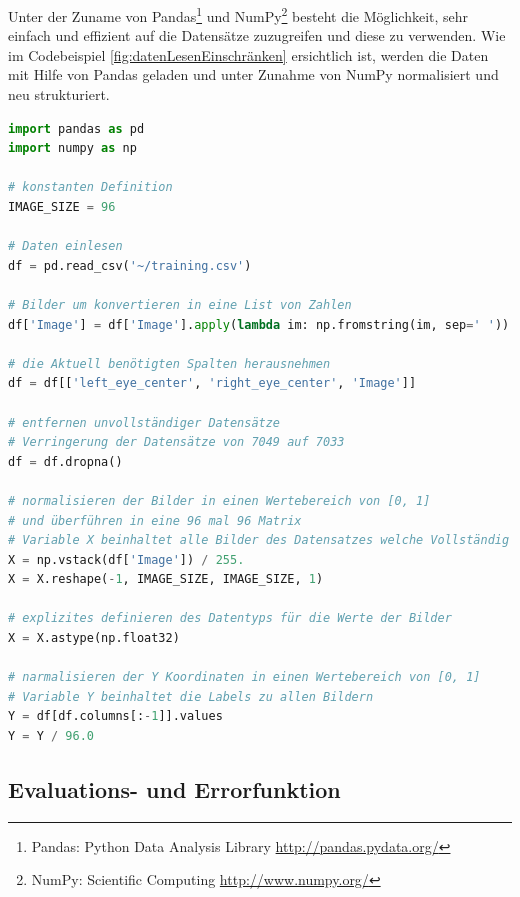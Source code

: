 \noindent
Unter der Zuname von Pandas\footnote{Pandas: Python Data Analysis Library \url{http://pandas.pydata.org/}} und NumPy\footnote{NumPy: Scientific Computing \url{http://www.numpy.org/}} besteht die Möglichkeit, sehr einfach und effizient auf die Datensätze zuzugreifen und diese zu verwenden. 
Wie im Codebeispiel \ref{fig:datenLesenEinschränken} ersichtlich ist, werden die Daten mit Hilfe von Pandas geladen und unter Zunahme von NumPy normalisiert und neu strukturiert. 
\begin{lstlisting}[caption={Daten einlesen und einschränken},label=fig:datenLesenEinschränken,captionpos=b,language=Python]
import pandas as pd
import numpy as np

# konstanten Definition
IMAGE_SIZE = 96

# Daten einlesen
df = pd.read_csv('~/training.csv')

# Bilder um konvertieren in eine List von Zahlen
df['Image'] = df['Image'].apply(lambda im: np.fromstring(im, sep=' '))

# die Aktuell benötigten Spalten herausnehmen
df = df[['left_eye_center', 'right_eye_center', 'Image']]

# entfernen unvollständiger Datensätze
# Verringerung der Datensätze von 7049 auf 7033
df = df.dropna()

# normalisieren der Bilder in einen Wertebereich von [0, 1] 
# und überführen in eine 96 mal 96 Matrix
# Variable X beinhaltet alle Bilder des Datensatzes welche Vollständig sind
X = np.vstack(df['Image']) / 255.
X = X.reshape(-1, IMAGE_SIZE, IMAGE_SIZE, 1)

# explizites definieren des Datentyps für die Werte der Bilder
X = X.astype(np.float32)

# narmalisieren der Y Koordinaten in einen Wertebereich von [0, 1]
# Variable Y beinhaltet die Labels zu allen Bildern
Y = df[df.columns[:-1]].values
Y = Y / 96.0
\end{lstlisting}

\subsection{Evaluations- und Errorfunktion}

